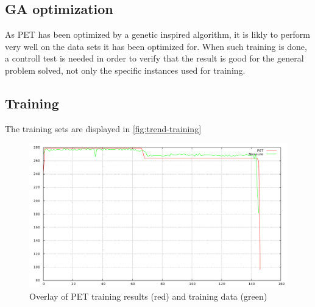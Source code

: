 \subsection{GA optimization}
As PET has been optimized by a genetic inspired algorithm, it is likly to perform very well on the data sets it
has been optimized for. When such training is done, a controll test is needed in order to verify that the result
is good for the general problem solved, not only the specific instances used for training.

\subsection{Training}

The training sets are displayed in \autoref{fig:trend-training}
\begin{figure}[ht]
\centering
\includegraphics[width=\textwidth]{figs/trend-training.pdf}
\caption{Overlay of PET training results (red) and training data (green)}
\label{fig:trend-training}
\end{figure}

